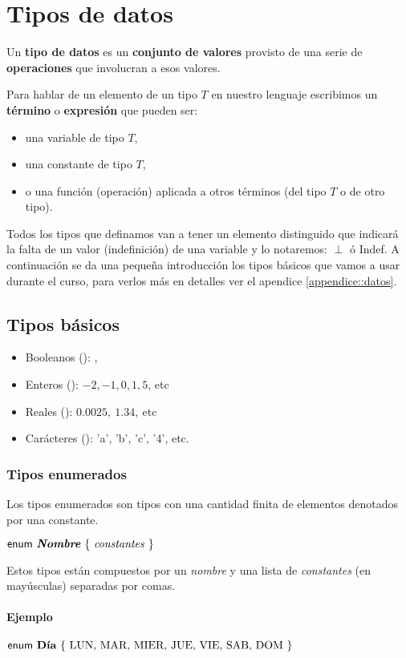 \section{Tipos de datos}
Un \textbf{tipo de datos} es un \textbf{conjunto de valores} provisto de una serie de \textbf{operaciones} que involucran a esos valores.

Para hablar de un elemento de un tipo $T$ en nuestro lenguaje escribimos un \textbf{término} o \textbf{expresión} que pueden ser:
\begin{itemize}
	\item una variable de tipo $T$,
	\item una constante de tipo $T$,
	\item o una función (operación) aplicada a otros términos (del tipo $T$ o de otro tipo).
\end{itemize}

Todos los tipos que definamos van a tener un elemento distinguido que indicará la falta de un valor (indefinición) de una variable y lo notaremos: $\perp$ ó Indef.  A continuación se da una pequeña introducción los tipos básicos que vamos a usar durante el curso, para verlos más en detalles ver el apendice \ref{appendice::datos}.

\subsection{Tipos básicos}
\begin{itemize}
	\item Booleanos (\bool): \True, \False
	\item Enteros (\ent): $-2,-1,0,1,5$, etc
	\item Reales (\float): $0.0025 ,~1.34,~$etc
	\item Carácteres (\cha): 'a', 'b', 'c', '4', etc.
\end{itemize}

\subsubsection{Tipos enumerados}
Los tipos enumerados son tipos con una cantidad finita de elementos denotados por una constante. 
\begin{center}
	$\mathsf{enum} ~\text{\normalfont\bfseries \textit{Nombre}} ~\{ ~\text{\textit{constantes}}~ \}$
\end{center}
Estos tipos están compuestos por un \textit{nombre} y una lista de \textit{constantes} (en mayúsculas) separadas por comas.
\paragraph{Ejemplo}
\begin{center}
	$\mathsf{enum} ~\text{\normalfont\bfseries Día} ~\{ ~\text{LUN, MAR, MIER, JUE, VIE, SAB, DOM}~ \}$
\end{center}
